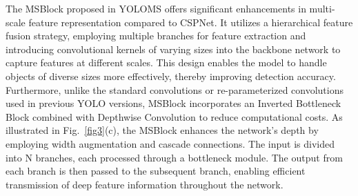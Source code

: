 The MSBlock proposed in YOLOMS offers significant enhancements in multi-scale feature representation compared to CSPNet. It utilizes a hierarchical feature fusion strategy, employing multiple branches for feature extraction and introducing convolutional kernels of varying sizes into the backbone network to capture features at different scales. This design enables the model to handle objects of diverse sizes more effectively, thereby improving detection accuracy. Furthermore, unlike the standard convolutions or re-parameterized convolutions used in previous YOLO versions, MSBlock incorporates an Inverted Bottleneck Block combined with Depthwise Convolution to reduce computational costs. As illustrated in Fig.~\ref{fig3}(c), the MSBlock enhances the network's depth by employing width augmentation and cascade connections. The input is divided into N branches, each processed through a bottleneck module. The output from each branch is then passed to the subsequent branch, enabling efficient transmission of deep feature information throughout the network.

